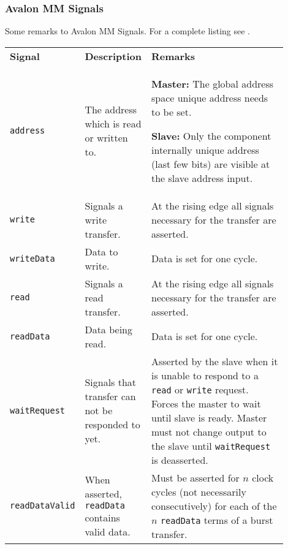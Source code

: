 		\subsubsection{Avalon MM Signals  }
			Some remarks to Avalon MM Signals. For a complete listing see .
			\begin{longtable}{|p{0.15\linewidth}||p{0.22\linewidth}|p{0.53\linewidth}|}					
				\hline
				\textbf{Signal}
					& \textbf{Description}
					& \textbf{Remarks}\\
				\hhline{|=#=|=|}
				\texttt{address}
					& The address which is read or written to. 
					&   \textbf{Master:} The global address space unique address needs to be set.
					
					  	\textbf{Slave:} Only the component internally unique address (last few bits) are visible at the slave address input.\\
				\hline
				\texttt{write}
					& Signals a write transfer.
					& At the rising edge all signals necessary for the transfer are asserted.\\
				\hline
				\texttt{writeData}
					& Data to write.
					& Data is set for one cycle.\\
				\hline
				\texttt{read}
					& Signals a read transfer.
					& At the rising edge all signals necessary for the transfer are asserted.\\
				\hline
				\texttt{readData}
					& Data being read.
					& Data is set for one cycle.\\
				\hline
				\texttt{waitRequest}
					& Signals that transfer can not be responded to yet.
					& Asserted by the slave when it is unable to respond to a \texttt{read} or \texttt{write} request. Forces the master to wait until slave is ready. Master must not change output to the slave until \texttt{waitRequest} is deasserted.\\
				\hline
				\texttt{readDataValid}
					& When asserted, \texttt{readData} contains valid data.
					& Must be asserted for $n$ clock cycles (not necessarily consecutively) for each of the $n$ \texttt{readData} terms of a burst transfer.\\
				\hline
			\end{longtable}
			
